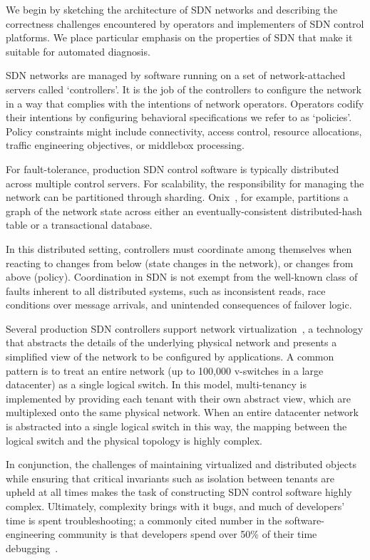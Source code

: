 We begin by sketching the architecture of SDN networks and
describing the correctness challenges encountered by operators and
implementers of SDN control platforms. We place particular emphasis on the
properties of SDN that make it suitable for automated diagnosis.

SDN networks are managed by software running on a set of network-attached
servers called `controllers'. It is the job of the controllers to configure
the network in a way that complies with the intentions of network
operators. Operators codify their intentions by configuring
behavioral specifications we refer to as `policies'. Policy constraints might
include connectivity, access control,
resource allocations, traffic engineering objectives, or middlebox
processing.

For fault-tolerance, production SDN control software is typically
distributed across multiple control servers. For scalability, the responsibility for
managing the network can be partitioned through sharding.
Onix~\cite{onix}, for example, partitions a
graph of the network state across either an eventually-consistent
distributed-hash table or a
transactional database.

In this distributed setting, controllers must coordinate among themselves
when reacting to changes from below (state changes in the network), or
changes from above (policy).
Coordination in SDN is not exempt from the well-known class of faults
inherent to all distributed systems, such as
inconsistent reads, race conditions over message arrivals, and
unintended consequences of failover logic.

Several production SDN controllers support network
virtualization~\cite{bigswitch,nicirahomepage,contextream}, a technology that
abstracts the details of the underlying physical network and presents a
simplified view of the network to be configured by applications.
A common pattern is to treat an entire network (up to
100,000 v-switches in a large datacenter) as a single logical switch.
In this model, multi-tenancy is implemented by providing each tenant with their
own abstract view, which are multiplexed onto the same physical network.
When an entire datacenter network is
abstracted into a single logical switch in this way, the mapping between
the logical switch and the physical topology is highly complex.

In conjunction, the challenges of maintaining virtualized and distributed
objects while ensuring that critical invariants such as isolation between
tenants are upheld at all times makes the task of constructing
SDN control software highly complex. Ultimately, complexity brings with it
bugs, and much of developers' time is spent troubleshooting; a commonly cited
number in the software-engineering community is that
developers spend over 50\% of their time
debugging~\cite{msoft_concurrency}. 

